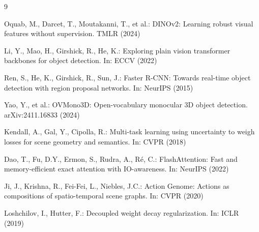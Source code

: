 \documentclass[runningheads]{llncs}
\begin{document}
{\small

\begin{thebibliography}{9}

Oquab, M., Darcet, T., Moutakanni, T., et al.: DINOv2: Learning robust visual features without supervision. TMLR (2024)

Li, Y., Mao, H., Girshick, R., He, K.: Exploring plain vision transformer backbones for object detection. In: ECCV (2022)

Ren, S., He, K., Girshick, R., Sun, J.: Faster R-CNN: Towards real-time object detection with region proposal networks. In: NeurIPS (2015)

Yao, Y., et al.: OVMono3D: Open-vocabulary monocular 3D object detection. arXiv:2411.16833 (2024)

Kendall, A., Gal, Y., Cipolla, R.: Multi-task learning using uncertainty to weigh losses for scene geometry and semantics. In: CVPR (2018)

Dao, T., Fu, D.Y., Ermon, S., Rudra, A., R{\'e}, C.: FlashAttention: Fast and memory-efficient exact attention with IO-awareness. In: NeurIPS (2022)

Ji, J., Krishna, R., Fei-Fei, L., Niebles, J.C.: Action Genome: Actions as compositions of spatio-temporal scene graphs. In: CVPR (2020)

Loshchilov, I., Hutter, F.: Decoupled weight decay regularization. In: ICLR (2019)

\end{thebibliography}
}
\end{document}
